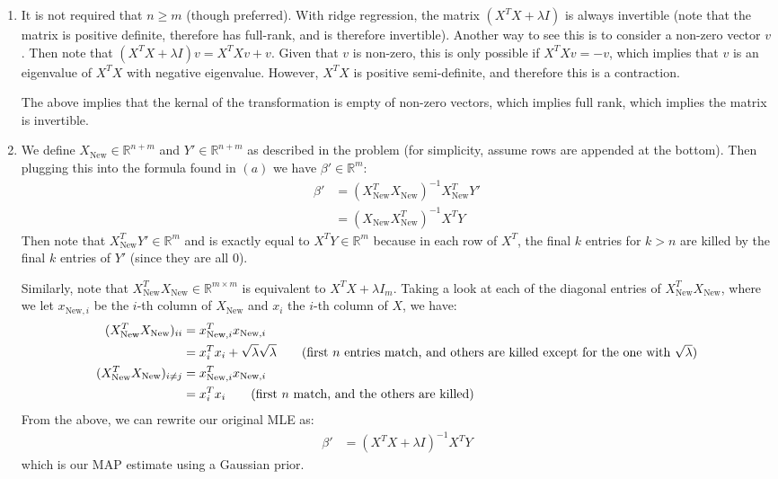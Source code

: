 \documentclass[submit]{harvardml}
\theoremstyle{plain}
\begin{document}
\begin{enumerate}[label=(\alph*)]
\item
It is not required that $n \geq m$ (though preferred). With ridge regression, the matrix $(X^TX + \lambda I)$ is always invertible (note that the matrix is positive definite, therefore has full-rank, and is therefore invertible). Another way to see this is to consider a non-zero vector $v$. Then note that $(X^TX + \lambda I)v = X^TXv + v$. Given that $v$ is non-zero, this is only possible if $X^TXv = -v$, which implies that $v$ is an eigenvalue of $X^TX$ with negative eigenvalue. However, $X^TX$ is positive semi-definite, and therefore this is a contraction.

The above implies that the kernal of the transformation is empty of non-zero vectors, which implies full rank, which implies the matrix is invertible.
\item We define $X_{\text{New}} \in \mathbb{R}^{n+m}$ and $Y' \in \mathbb{R}^{n+m}$ as described in the problem (for simplicity, assume rows are appended at the bottom). Then plugging this into the formula found in $(a)$ we have $\beta' \in \mathbb{R}^m$:
\begin{align*}
\beta' &= (X_{\text{New}}^TX_{\text{New}})^{-1}X_{\text{New}}^TY' \\
&= (X_{\text{New}}X_{\text{New}}^T)^{-1}X^TY
\end{align*}
Then note that $X_{\text{New}}^TY' \in \mathbb{R}^m$ and is exactly equal to $X^TY \in \mathbb{R}^m$ because in each row of $X^T$, the final $k$ entries for $k > n$  are killed by the final $k$ entries of $Y'$ (since they are all $0$).

Similarly, note that $X_{\text{New}}^T X_{\text{New}} \in \mathbb{R}^{m \times m}$ is equivalent to $X^TX + \lambda I_m$. Taking a look at each of the diagonal entries of $X_{\text{New}}^TX_{\text{New}}$, where we let $x_{\text{New},i}$ be the $i$-th column of $X_{\text{New}}$ and $x_i$ the $i$-th column of $X$, we have:
\begin{align*}
(X_{\text{New}}^T X_{\text{New}})_{ii} &= x_{\text{New},i}^Tx_{\text{New},i} \\
&= x_i^Tx_i + \sqrt{\lambda}\sqrt{\lambda} \tag{first $n$ entries match, and others are killed except for the one with $\sqrt{\lambda}$} \\
(X_{\text{New}}^TX_{\text{New}})_{i\neq j} &= x_{\text{New},i}^Tx_{\text{New},i} \\
&= x_i^Tx_i \tag{first $n$ match, and the others are killed}
\end{align*}
From the above, we can rewrite our original MLE as:
\begin{align*}
\beta' &= (X^TX + \lambda I)^{-1}X^TY
\end{align*}
which is our MAP estimate using a Gaussian prior.
\end{enumerate}
\end{document}
